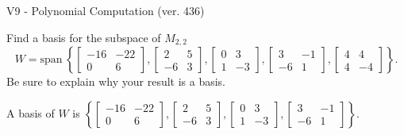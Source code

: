 \begin{exercise}
  \begin{exerciseTitle}V9 - Polynomial Computation (ver. 436)\end{exerciseTitle}
  \begin{exerciseStatement}
    Find a basis for the subspace of \(M_{2,2}\) 
\[W=\mathrm{span}\ \left\{\left[\begin{array}{cc}
-16 & -22 \\
0 & 6
\end{array}\right] , \left[\begin{array}{cc}
2 & 5 \\
-6 & 3
\end{array}\right] , \left[\begin{array}{cc}
0 & 3 \\
1 & -3
\end{array}\right] , \left[\begin{array}{cc}
3 & -1 \\
-6 & 1
\end{array}\right] , \left[\begin{array}{cc}
4 & 4 \\
4 & -4
\end{array}\right]\right\}.\]
 Be sure to explain why your result is a basis.


  \end{exerciseStatement}
  \begin{exerciseAnswer}
   A basis of \(W\) is  \(\left\{\left[\begin{array}{cc}
-16 & -22 \\
0 & 6
\end{array}\right] , \left[\begin{array}{cc}
2 & 5 \\
-6 & 3
\end{array}\right] , \left[\begin{array}{cc}
0 & 3 \\
1 & -3
\end{array}\right] , \left[\begin{array}{cc}
3 & -1 \\
-6 & 1
\end{array}\right]\right\}\).
  


  \end{exerciseAnswer}
\end{exercise}